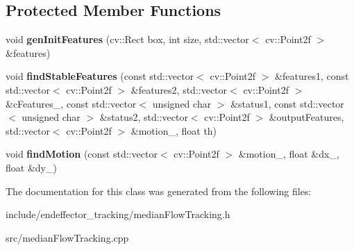 \subsection*{\-Protected \-Member \-Functions}
\begin{DoxyCompactItemize}
\item 
\hypertarget{classmedianFlowTracking_acee673da7d3431c31c346d22f5ae32aa}{void {\bfseries gen\-Init\-Features} (cv\-::\-Rect box, int size, std\-::vector$<$ cv\-::\-Point2f $>$ \&features)}\label{classmedianFlowTracking_acee673da7d3431c31c346d22f5ae32aa}

\item 
\hypertarget{classmedianFlowTracking_a1fd3c7e949ce0585eaad648385aff374}{void {\bfseries find\-Stable\-Features} (const std\-::vector$<$ cv\-::\-Point2f $>$ \&features1, const std\-::vector$<$ cv\-::\-Point2f $>$ \&features2, std\-::vector$<$ cv\-::\-Point2f $>$ \&c\-Features\-\_\-, const std\-::vector$<$ unsigned char $>$ \&status1, const std\-::vector$<$ unsigned char $>$ \&status2, std\-::vector$<$ cv\-::\-Point2f $>$ \&output\-Features, std\-::vector$<$ cv\-::\-Point2f $>$ \&motion\-\_\-, float th)}\label{classmedianFlowTracking_a1fd3c7e949ce0585eaad648385aff374}

\item 
\hypertarget{classmedianFlowTracking_a44e062a9052589b43e364aa3b2b75f9b}{void {\bfseries find\-Motion} (const std\-::vector$<$ cv\-::\-Point2f $>$ \&motion\-\_\-, float \&dx\-\_\-, float \&dy\-\_\-)}\label{classmedianFlowTracking_a44e062a9052589b43e364aa3b2b75f9b}

\end{DoxyCompactItemize}


\-The documentation for this class was generated from the following files\-:\begin{DoxyCompactItemize}
\item 
include/endeffector\-\_\-tracking/median\-Flow\-Tracking.\-h\item 
src/median\-Flow\-Tracking.\-cpp\end{DoxyCompactItemize}
